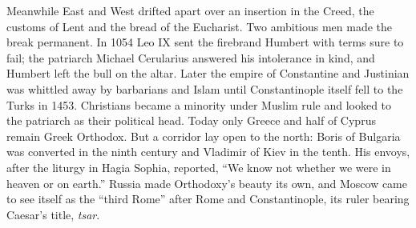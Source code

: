 Meanwhile East and West drifted apart over an insertion in the Creed, the customs of Lent and the
bread of the Eucharist. Two ambitious men made the break permanent. In 1054 Leo IX sent the firebrand
Humbert with terms sure to fail; the patriarch Michael Cerularius answered his intolerance in kind,
and Humbert left the bull on the altar. Later the empire of Constantine and Justinian was whittled
away by barbarians and Islam until Constantinople itself fell to the Turks in 1453. Christians became
a minority under Muslim rule and looked to the patriarch as their political head. Today only Greece
and half of Cyprus remain Greek Orthodox. But a corridor lay open to the north: Boris of Bulgaria was
converted in the ninth century and Vladimir of Kiev in the tenth. His envoys, after the liturgy in
Hagia Sophia, reported, ``We know not whether we were in heaven or on earth.'' Russia made Orthodoxy's
beauty its own, and Moscow came to see itself as the ``third Rome'' after Rome and Constantinople, its
ruler bearing Caesar's title, \emph{tsar}.

\begin{keyfacts}
\end{keyfacts}
